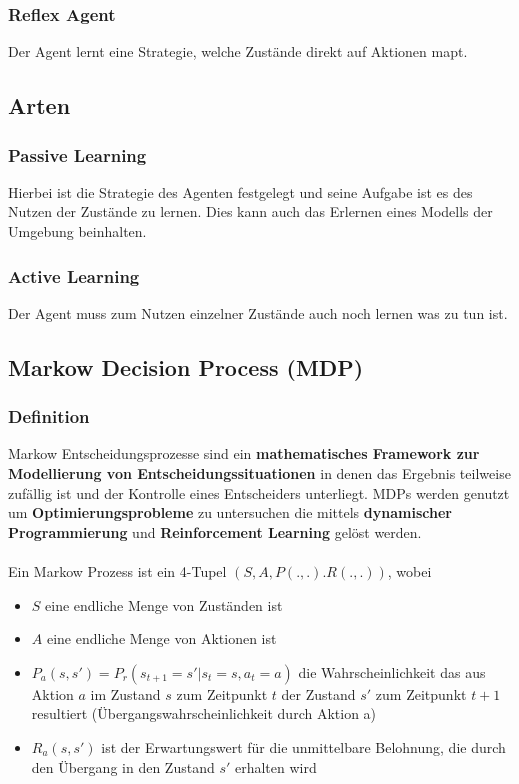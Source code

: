 \documentclass[10pt]{scrartcl}
\begin{document}
\subsubsection{Reflex Agent}
Der Agent lernt eine Strategie, welche Zustände direkt auf Aktionen mapt.

\subsection{Arten}
\subsubsection{Passive Learning}
Hierbei ist die Strategie des Agenten festgelegt und seine Aufgabe ist es des Nutzen der Zustände zu lernen. Dies kann auch das Erlernen eines Modells der Umgebung beinhalten.

\subsubsection{Active Learning}
Der Agent muss zum Nutzen einzelner Zustände auch noch lernen was zu tun ist.

\subsection{Markow Decision Process (MDP)}
\subsubsection{Definition}
Markow Entscheidungsprozesse sind ein \textbf{mathematisches Framework zur Modellierung von Entscheidungssituationen} in denen das Ergebnis teilweise zufällig ist und der Kontrolle eines Entscheiders unterliegt. MDPs werden genutzt um \textbf{Optimierungsprobleme} zu untersuchen die mittels \textbf{dynamischer Programmierung} und \textbf{Reinforcement Learning} gelöst werden.\\
\\
Ein Markow Prozess ist ein 4-Tupel $(S,A,P(.,.).R(.,.))$, wobei

\begin{itemize}
\item{$S$ eine endliche Menge von Zuständen ist}
\item{$A$ eine endliche Menge von Aktionen ist}
\item{$P_{a}(s,s') = P_{r}(s_{t+1} = s' | s_{t} = s, a_{t} = a)$ die Wahrscheinlichkeit das aus Aktion $a$ im Zustand $s$ zum Zeitpunkt $t$ der  Zustand $s'$ zum Zeitpunkt $t+1$ resultiert  (Übergangswahrscheinlichkeit durch Aktion a)}
\item{$R_{a}(s,s')$ ist der Erwartungswert für die unmittelbare Belohnung, die durch den Übergang in den Zustand $s'$ erhalten wird}
\end{itemize}
\end{document}
